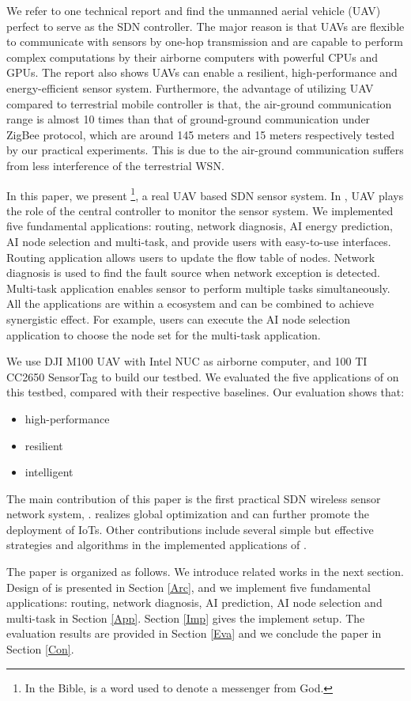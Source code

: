 We refer to one technical report \cite{}
and find the unmanned aerial vehicle (UAV) 
\cite{Cambone2005Unmanned, Perry2000Unmanned, Cathcart2014Method}
perfect to serve as the SDN controller.
The major reason is that UAVs are flexible to 
communicate with sensors by one-hop transmission
and are capable to perform complex computations 
by their airborne computers with powerful CPUs and GPUs.
The report also shows UAVs can enable a resilient, 
high-performance and energy-efficient sensor system.
Furthermore, the advantage of utilizing UAV compared to
terrestrial mobile controller is that, the air-ground communication range
is almost 10 times than that of ground-ground communication under ZigBee protocol, which are
around 145 meters and 15 meters respectively tested by our practical experiments.
This is due to the air-ground communication suffers from less interference of the terrestrial WSN.

In this paper, we present {\sdn}\footnote{In the Bible, {\sdn} is a word used to denote a messenger from God. }, 
a real UAV based SDN sensor system.
In {\sdn}, UAV plays the role of the central controller to monitor the sensor system.
We implemented five fundamental applications: routing, network diagnosis, 
AI energy prediction, AI node selection and multi-task,
and provide users with easy-to-use interfaces.
Routing application allows users to update the flow table of nodes.
Network diagnosis is used to find the fault source when network exception is detected.
Multi-task application enables sensor to perform multiple 
tasks simultaneously. All the applications are within a ecosystem
and can be combined to achieve synergistic effect. For example,
users can execute the AI node selection application to choose
the node set for the multi-task application. 


We use DJI M100 UAV with Intel NUC as airborne computer, 
and 100 TI CC2650 SensorTag to build our testbed.
We evaluated the five applications of  {\sdn} on this testbed, 
compared with their respective baselines.
Our evaluation shows that:
\begin{itemize}
\item[1)] high-performance
\item[2)] resilient
\item[3)] intelligent
\end{itemize}

The main contribution of this paper is the first 
practical SDN wireless sensor network system, {\sdn}. 
{\sdn} realizes global optimization and can further promote the deployment of IoTs.
Other contributions include several simple but effective strategies and algorithms 
in the implemented applications of {\sdn}.


The paper is organized as follows. We introduce related works in the next section. 
Design of {\sdn} is presented in Section \ref{Arc}, 
and we implement five fundamental applications: routing, network diagnosis, 
AI prediction, AI node selection and multi-task in Section \ref{App}. 
Section \ref{Imp} gives the implement setup.
The evaluation results are provided in Section \ref{Eva} 
and we conclude the paper in Section \ref{Con}.